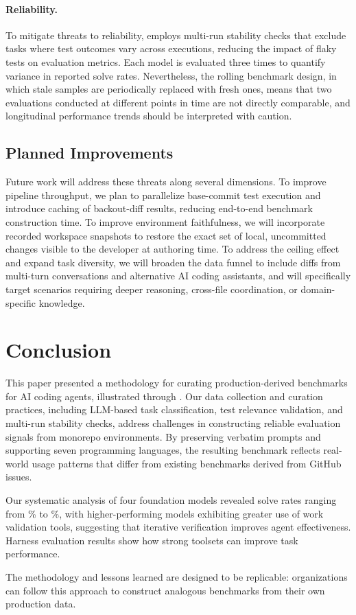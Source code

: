 \paragraph{Reliability.}
To mitigate threats to reliability, \benchmark{} employs multi-run stability checks that exclude tasks where test outcomes vary across executions, reducing the impact of flaky tests on evaluation metrics. Each model is evaluated three times to quantify variance in reported solve rates. Nevertheless, the rolling benchmark design, in which stale samples are periodically replaced with fresh ones, means that two evaluations conducted at different points in time are not directly comparable, and longitudinal performance trends should be interpreted with caution.

\subsection{Planned Improvements}

Future work will address these threats along several dimensions. To improve pipeline throughput, we plan to parallelize base-commit test execution and introduce caching of backout-diff results, reducing end-to-end benchmark construction time. To improve environment faithfulness, we will incorporate recorded workspace snapshots to restore the exact set of local, uncommitted changes visible to the developer at authoring time. To address the ceiling effect and expand task diversity, we will broaden the data funnel to include diffs from multi-turn conversations and alternative AI coding assistants, and will specifically target scenarios requiring deeper reasoning, cross-file coordination, or domain-specific knowledge.

\section{Conclusion}
\label{sec:conclusion}

This paper presented a methodology for curating production-derived benchmarks for AI coding agents, illustrated through \benchmark{}.
Our data collection and curation practices, including LLM-based task classification, test relevance validation, and multi-run stability checks, address challenges in constructing reliable evaluation signals from monorepo environments.
By preserving verbatim prompts and supporting seven programming languages, the resulting benchmark reflects real-world usage patterns that differ from existing benchmarks derived from GitHub issues.

Our systematic analysis of four foundation models revealed solve rates ranging from \SolveRateLowest{}\% to \SolveRateHighest{}\%, with higher-performing models exhibiting greater use of work validation tools, suggesting that iterative verification improves agent effectiveness. Harness evaluation results show how strong toolsets can improve task performance.

The methodology and lessons learned are designed to be replicable: organizations can follow this approach to construct analogous benchmarks from their own production data.
